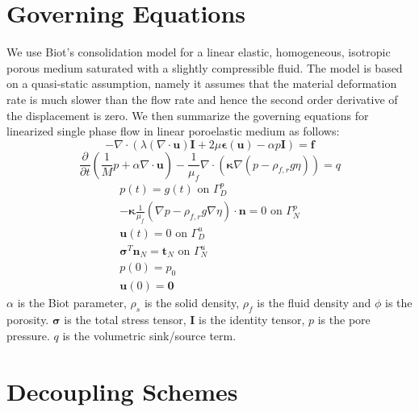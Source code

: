 \documentclass[letterpaper,11pt]{article}
\begin{document}
 \section{Governing Equations}
 We use Biot's consolidation model for a linear elastic, homogeneous, isotropic porous medium saturated with a slightly compressible fluid. The model is based on a quasi-static assumption, namely it assumes that the material deformation rate is much slower than the flow rate and hence the second order derivative of the displacement is zero. We then summarize the governing equations for linearized single phase flow in linear poroelastic medium as follows:
\begin{equation}\label{eq:sum-1}
    -\nabla \cdot (\lambda (\nabla \cdot \bm{u})\bm{I}+2\mu\bm{\epsilon}(\bm{u}) -\alpha p \bm{I}) = \bm{f}
\end{equation}
\begin{equation}
    \frac{\partial}{\partial t}\left( 
    \frac{1}{M} p+\alpha \nabla \cdot \bm{u} \right)-\frac{1}{\mu_f} \nabla \cdot (\bm{\kappa}\nabla (p-\rho_{f,r}g\eta))=q
\end{equation}
\begin{align}
    p(t)=g(t) \text{ on } \Gamma^p_D\\
    -\bm{\kappa} \frac{1}{\mu_f}(\nabla p -\rho_{f,r} g\nabla \eta)\cdot \bm{n} =0 \text{ on }\Gamma^p_N\\
    \bm{u}(t) = 0 \text{ on } \Gamma^u_D\\
    \bm{\sigma}^T\bm{n}_N=\bm{t}_N \text{ on } \Gamma^u_N\\
    p(0) =p_0\\
    \bm{u}(0)=\bm{0}\label{eq:sum-last}
\end{align}
$\alpha$ is the Biot parameter, $\rho_s$ is the solid density, $\rho_f$ is the fluid density and $\phi$ is the porosity. $\bm{\sigma}$ is the total stress tensor, $\bm{I}$ is the identity tensor, $p$ is the pore pressure. $q$ is the volumetric sink/source term.

\section{Decoupling Schemes}
\end{document}
